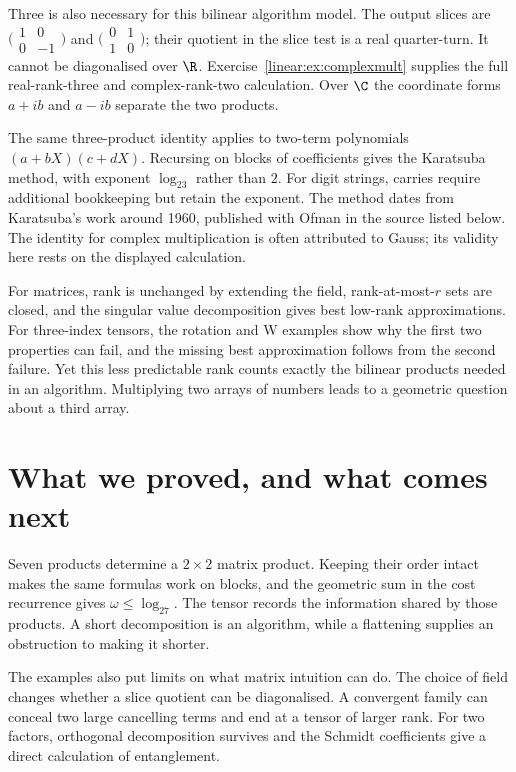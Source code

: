 Three is also necessary for this bilinear algorithm model. The output slices are
$\bigl(\begin{smallmatrix}1&0\\0&-1\end{smallmatrix}\bigr)$ and
$\bigl(\begin{smallmatrix}0&1\\1&0\end{smallmatrix}\bigr)$; their quotient in the slice test is a real quarter-turn. It cannot be diagonalised over $\R$. Exercise~\ref{linear:ex:complexmult} supplies the full real-rank-three and complex-rank-two calculation. Over $\C$ the coordinate forms $a+ib$ and $a-ib$ separate the two products.

The same three-product identity applies to two-term polynomials $(a+bX)(c+dX)$. Recursing on blocks of coefficients gives the Karatsuba method, with exponent $\log_23$ rather than $2$. For digit strings, carries require additional bookkeeping but retain the exponent. The method dates from Karatsuba's work around 1960, published with Ofman in the source listed below. The identity for complex multiplication is often attributed to Gauss; its validity here rests on the displayed calculation.

\begin{beauty}
For matrices, rank is unchanged by extending the field, rank-at-most-$r$ sets are closed, and the singular value decomposition gives best low-rank approximations. For three-index tensors, the rotation and W examples show why the first two properties can fail, and the missing best approximation follows from the second failure. Yet this less predictable rank counts exactly the bilinear products needed in an algorithm. Multiplying two arrays of numbers leads to a geometric question about a third array.
\end{beauty}

\section{What we proved, and what comes next}

Seven products determine a $2\times2$ matrix product. Keeping their order intact makes the same formulas work on blocks, and the geometric sum in the cost recurrence gives $\omega\le\log_27$. The tensor records the information shared by those products. A short decomposition is an algorithm, while a flattening supplies an obstruction to making it shorter.

The examples also put limits on what matrix intuition can do. The choice of field changes whether a slice quotient can be diagonalised. A convergent family can conceal two large cancelling terms and end at a tensor of larger rank. For two factors, orthogonal decomposition survives and the Schmidt coefficients give a direct calculation of entanglement.

